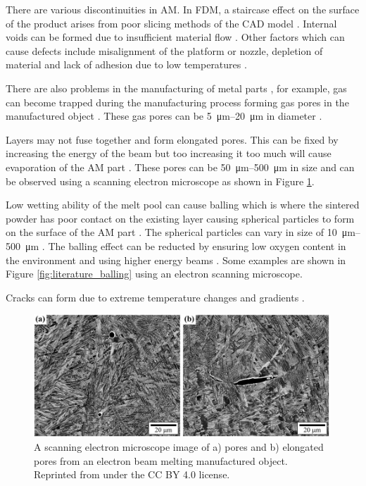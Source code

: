 There are various discontinuities in AM. In FDM, a staircase effect on the surface of the product arises from poor slicing methods of the CAD model \citep{weeren1995quality}. Internal voids can be formed due to insufficient material flow \citep{weeren1995quality}. Other factors which can cause defects include misalignment of the platform or nozzle, depletion of material and lack of adhesion due to low temperatures \citep{gunaydin2018common}.

There are also problems in the manufacturing of metal parts \citep{everton2016review}, for example, gas can become trapped during the manufacturing process forming gas pores in the manufactured object \citep{thijs2010study, tammas2015xct}. These gas pores can be \SIrange{5}{20}{\micro\metre} in diameter \citep{everton2016review}.

Layers may not fuse together and form elongated pores. This can be fixed by increasing the energy of the beam but too increasing it too much will cause evaporation of the AM part \citep{mumtaz2008high}. These pores can be \SIrange{50}{500}{\micro\metre} in size \citep{everton2016review} and can be observed using a scanning electron microscope as shown in Figure \ref{fig:literature_pores}.

Low wetting ability of the melt pool can cause balling which is where the sintered powder has poor contact on the existing layer causing spherical particles to form on the surface of the AM part \citep{li2012balling, gu2009balling}. The spherical particles can vary in size of \SIrange{10}{500}{\micro\metre} \citep{li2012balling}. The balling effect can be reducted by ensuring low oxygen content in the environment \citep{niu1999instability} and using higher energy beams \citep{gu2009balling}. Some examples are shown in Figure \ref{fig:literature_balling} using an electron scanning microscope.

Cracks can form due to extreme temperature changes and gradients \citep{mercelis2006residual, zaeh2010investigations}.

\begin{figure}
  \centering
  \includegraphics[width=0.99\textwidth]{../figures/literatureReview/literature_pores.png}
  \caption{A scanning electron microscope image of a) pores and b) elongated pores from an electron beam melting manufactured object. Reprinted from \cite{tammas2015xct} under the CC BY 4.0 license.}
  \label{fig:literature_pores}
\end{figure}

